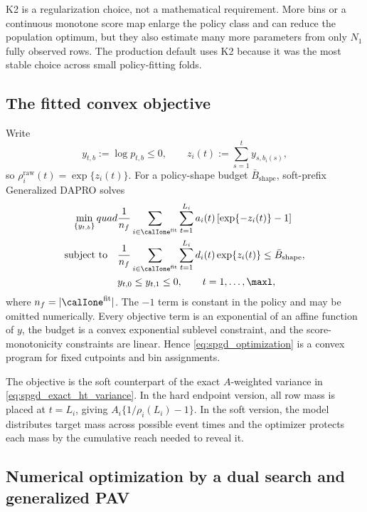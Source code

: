 K2 is a regularization choice, not a mathematical requirement.  More bins or
a continuous monotone score map enlarge the policy class and can reduce the
population optimum, but they also estimate many more parameters from only
$N_1$ fully observed rows.  The production default uses K2 because it was the
most stable choice across small policy-fitting folds.

\subsection{The fitted convex objective}

Write
\begin{equation}
    y_{t,b}:=\log p_{t,b}\leq0,
    \qquad
    z_i(t):=\sum_{s=1}^{t}y_{s,b_i(s)},
\end{equation}
so $\rho_i^{\mathrm{raw}}(t)=\exp\{z_i(t)\}$.  For a policy-shape budget
$\bar B_{\mathrm{shape}}$, soft-prefix Generalized DAPRO solves
\begin{equation}
\begin{aligned}
    \min_{\{y_{t,b}\}}quad
    &\frac{1}{n_f}\sum_{i\in\calIone^{\mathrm{fit}}}
      \sum_{t=1}^{L_i}a_i(t)
      \left[\exp\{-z_i(t)\}-1\right]\\
    \text{subject to}\quad
    &\frac{1}{n_f}\sum_{i\in\calIone^{\mathrm{fit}}}
      \sum_{t=1}^{L_i}d_i(t)\exp\{z_i(t)\}
      \leq\bar B_{\mathrm{shape}},\\
    &y_{t,0}\leq y_{t,1}\leq0,
      \qquad t=1,\ldots,\maxl,
\end{aligned}
\label{eq:spgd_optimization}
\end{equation}
where $n_f=|\calIone^{\mathrm{fit}}|$.  The $-1$ term is constant in the
policy and may be omitted numerically.  Every objective term is an exponential
of an affine function of $y$, the budget is a convex exponential sublevel
constraint, and the score-monotonicity constraints are linear.  Hence
\eqref{eq:spgd_optimization} is a convex program for fixed cutpoints and bin
assignments.

The objective is the soft counterpart of the exact $A$-weighted variance in
\eqref{eq:spgd_exact_ht_variance}.  In the hard endpoint version, all row mass
is placed at $t=L_i$, giving
$A_i\{1/\rho_i(L_i)-1\}$.  In the soft version, the model distributes target
mass across possible event times and the optimizer protects each mass by the
cumulative reach needed to reveal it.

\subsection{Numerical optimization by a dual search and generalized PAV}

